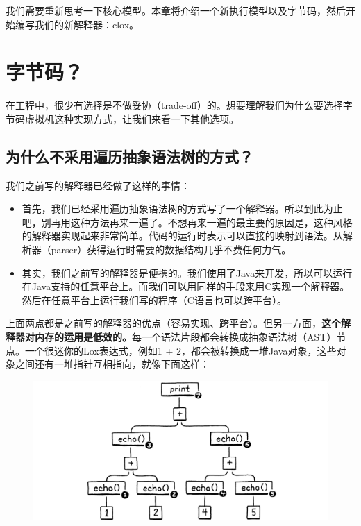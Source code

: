 \documentclass[cn,10pt,math=newtx,citestyle=gb7714-2015,bibstyle=gb7714-2015]{elegantbook}
\begin{document}
我们需要重新思考一下核心模型。本章将介绍一个新执行模型以及字节码，然后开始编写我们的新解释器：clox。

\section{字节码？}

在工程中，很少有选择是不做妥协（trade-off）的。想要理解我们为什么要选择字节码虚拟机这种实现方式，让我们来看一下其他选项。

\subsection{为什么不采用遍历抽象语法树的方式？}

我们之前写的解释器已经做了这样的事情：

\begin{itemize}
   \item 首先，我们已经采用遍历抽象语法树的方式写了一个解释器。所以到此为止吧，别再用这种方法再来一遍了。不想再来一遍的最主要的原因是，这种风格的解释器实现起来非常简单。代码的运行时表示可以直接的映射到语法。从解析器（parser）获得运行时需要的数据结构几乎不费任何力气。
   \item 其实，我们之前写的解释器是便携的。我们使用了Java来开发，所以可以运行在Java支持的任意平台上。而我们可以用同样的手段来用C实现一个解释器。然后在任意平台上运行我们写的程序（C语言也可以跨平台）。
\end{itemize}

上面两点都是之前写的解释器的优点（容易实现、跨平台）。但另一方面，\textbf{这个解释器对内存的运用是低效的。}每一个语法片段都会转换成抽象语法树（AST）节点。一个很迷你的Lox表达式，例如1 + 2，都会被转换成一堆Java对象，这些对象之间还有一堆指针互相指向，就像下面这样：

\begin{figure}[h]
\centering
\includegraphics[width=\textwidth]{image/a-virtual-machine/ast.png}
\end{figure}
\end{document}

